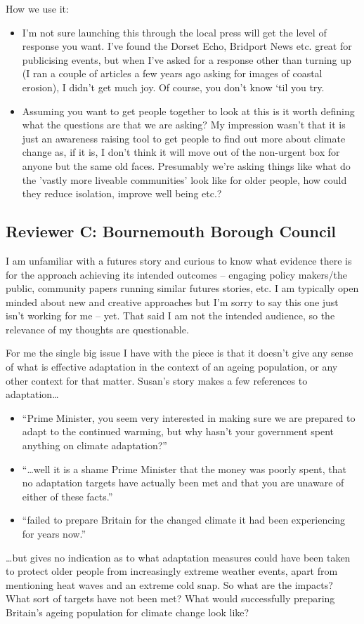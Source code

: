 How we use it:
\begin{itemize}
\item I'm not sure launching this through the local press will get the level of response you want. I've found the Dorset Echo, Bridport News etc. great for publicising events, but when I've asked for a response other than turning up (I ran a couple of articles a few years ago asking for images of coastal erosion), I didn't get much joy. Of course, you don't know `til you try.
\item Assuming you want to get people together to look at this is it worth defining what the questions are that we are asking? My impression wasn't that it is just an awareness raising tool to get people to find out more about climate change as, if it is, I don't think it will move out of the non-urgent box for anyone but the same old faces.  Presumably we're asking things like what do the 'vastly more liveable communities' look like for older people, how could they reduce isolation, improve well being etc.?
\end{itemize}

\subsection{Reviewer C: Bournemouth Borough Council}
I am unfamiliar with a futures story and curious to know what evidence there is for the approach achieving its intended outcomes -- engaging policy makers/the public, community papers running similar futures stories, etc. I am typically open minded about new and creative approaches but I'm sorry to say this one just isn't working for me -- yet. That said I am not the intended audience, so the relevance of my thoughts are questionable.
 
For me the single big issue I have with the piece is that it doesn't give any sense of what is effective adaptation in the context of an ageing population, or any other context for that matter. Susan's story makes a few references to adaptation\ldots

\begin{itemize}
\item ``Prime Minister, you seem very interested in making sure we are prepared to adapt to the continued warming, but why hasn't your government spent anything on climate adaptation?''
\item ``\ldots well it is a shame Prime Minister that the money was poorly spent, that no adaptation targets have actually been met and that you are unaware of either of these facts.''
\item ``failed to prepare Britain for the changed climate it had been experiencing for years now.''
\end{itemize}
\dots but gives no indication as to what adaptation measures could have been taken to protect older people from increasingly extreme weather events, apart from mentioning heat waves and an extreme cold snap. So what are the impacts? What sort of targets have not been met? What would successfully preparing Britain's ageing population for climate change look like?
 
